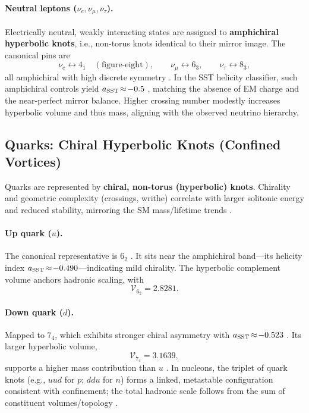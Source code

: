 \documentclass[11pt]{article}
\begin{document}
        \paragraph{Neutral leptons ($\nu_e,\nu_\mu,\nu_\tau$).}
            Electrically neutral, weakly interacting states are assigned to \textbf{amphichiral hyperbolic knots}, i.e., non-torus knots identical to their mirror image. The canonical pins are
            \[
                \nu_e \leftrightarrow 4_1\quad(\text{figure-eight}),\qquad
                \nu_\mu \leftrightarrow 6_3,\qquad
                \nu_\tau \leftrightarrow 8_3,
            \]
            all amphichiral with high discrete symmetry \cite{KnotAtlas}. In the SST helicity classifier, such amphichiral controls yield $a_{\rm SST}\!\approx\!-0.5$ \cite{Iskandarani2025Helicity}, matching the absence of EM charge and the near-perfect mirror balance. Higher crossing number modestly increases hyperbolic volume and thus mass, aligning with the observed neutrino hierarchy.

\subsection{Quarks: Chiral Hyperbolic Knots (Confined Vortices)}

    Quarks are represented by \textbf{chiral, non-torus (hyperbolic) knots}. Chirality and geometric complexity (crossings, writhe) correlate with larger solitonic energy and reduced stability, mirroring the SM mass/lifetime trends \cite{Iskandarani2025Helicity}.

    \paragraph{Up quark ($u$).}
        The canonical representative is $6_2$ \cite{Iskandarani2025Helicity}. It sits near the amphichiral band—its helicity index $a_{\rm SST}\!\approx\!-0.490$—indicating mild chirality. The hyperbolic complement volume anchors hadronic scaling, with
        \[
            \mathcal{V}_{6_2}=2.8281.
        \]

    \paragraph{Down quark ($d$).}
        Mapped to $7_4$, which exhibits stronger chiral asymmetry with $a_{\rm SST}\!\approx\!-0.523$ \cite{Iskandarani2025Helicity}. Its larger hyperbolic volume,
        \[
            \mathcal{V}_{7_4}=3.1639,
        \]
        supports a higher mass contribution than $u$ \cite{Iskandarani2025Mass}. In nucleons, the triplet of quark knots (e.g., $u\!u\!d$ for $p$; $d\!d\!u$ for $n$) forms a linked, metastable configuration consistent with confinement; the total hadronic scale follows from the sum of constituent volumes/topology \cite{Iskandarani2025Mass}.
\end{document}
